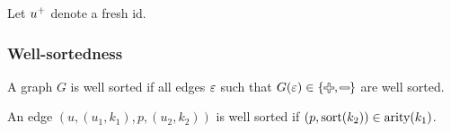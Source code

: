 

Let ${u}^{+}$ denote a fresh id.


\subsubsection{Well-sortedness}

\begin{definition}
  A graph $G$ is well sorted if all edges $\varepsilon$ such that $G(\e) \in \{\Plus, \Minus\}$ are well sorted.
\end{definition}

\begin{definition}
  An edge $(u, (u_1, k_1), p, (u_2, k_2))$ is well sorted if $(p, \operatorname{\text{sort}}\mathopen{}\left(k_2\right)\mathclose{}) \in \operatorname{\text{arity}}\mathopen{}\left(k_1\right)\mathclose{}$.
\end{definition}

